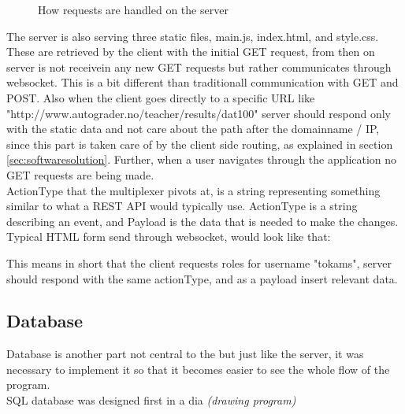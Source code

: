 \begin{figure}[h]
  
  \caption{How requests are handled on the server}
  \label{fig:serverwebsocket}
\end{figure}

The server is also serving three static files, main.js, index.html, and style.css. These are retrieved by the client with the initial GET request, from then on server is not receivein any new GET requests but rather communicates through websocket. This is a bit different than traditionall communication with GET and POST. Also when the client goes directly to a specific URL like "http://www.autograder.no/teacher/results/dat100" server should respond only with the static data and not care about the path after the domainname / IP, since this part is taken care of by the client side routing, as explained in section \ref{sec:softwaresolution}. Further, when a user navigates through the application no GET requests are being made.
\\ActionType that the multiplexer pivots at, is a string representing something similar to what a REST API would typically use. ActionType is a string describing an event, and Payload is the data that is needed to make the changes. Typical HTML form send through websocket, would look like that:


This means in short that the client requests roles for username "tokams", server should respond with the same actionType, and as a payload insert relevant data.

\subsection {Database}
Database is another part not central to the  but just like the server, it was necessary to implement it so that it becomes easier to see the whole flow of the program.
\\SQL database was designed first in a dia \emph{(drawing program)} 

